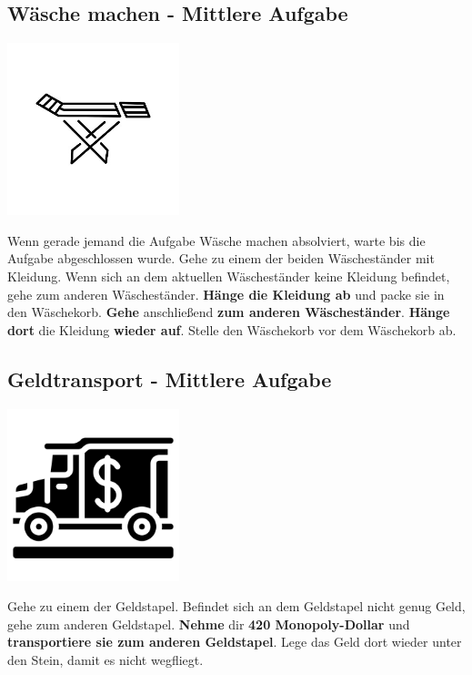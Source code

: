 \subsection{Wäsche machen - Mittlere Aufgabe}
\vfill
\begin{center}
    \includegraphics[height=5cm]{graphics/clothes_horse.jpg}
\end{center}
\vfill
Wenn gerade jemand die Aufgabe Wäsche machen absolviert, warte bis die Aufgabe
abgeschlossen wurde.
Gehe zu einem der beiden Wäscheständer mit Kleidung.
Wenn sich an dem aktuellen Wäscheständer keine Kleidung befindet, gehe zum
anderen Wäscheständer.
\textbf{Hänge die Kleidung ab} und packe sie in den Wäschekorb.
\textbf{Gehe} anschließend \textbf{zum anderen Wäscheständer}.
\textbf{Hänge dort} die Kleidung \textbf{wieder auf}.
Stelle den Wäschekorb vor dem Wäschekorb ab.
\newline
\newpage

\subsection{Geldtransport - Mittlere Aufgabe}
\vfill
\begin{center}
    \includegraphics[height=5cm]{graphics/money_transport.png}
\end{center}
\vfill
Gehe zu einem der Geldstapel.
Befindet sich an dem Geldstapel nicht genug Geld, gehe zum anderen Geldstapel.
\textbf{Nehme} dir \textbf{420 Monopoly-Dollar} und \textbf{transportiere sie
zum anderen Geldstapel}.
Lege das Geld dort wieder unter den Stein, damit es nicht wegfliegt.
\newline
\newpage

